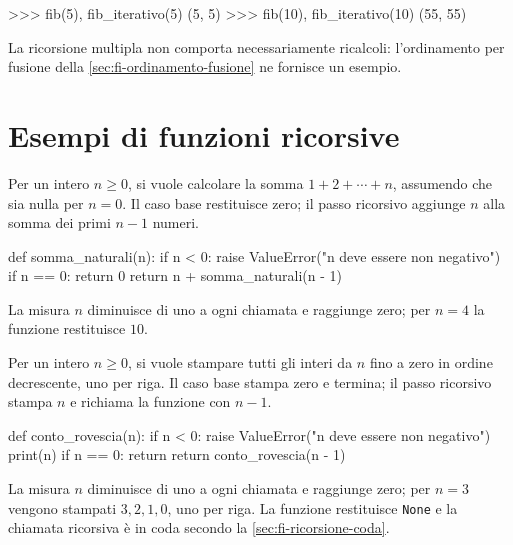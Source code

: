 \begin{unipdterminal}
>>> fib(5), fib_iterativo(5)
(5, 5)
>>> fib(10), fib_iterativo(10)
(55, 55)
\end{unipdterminal}

La ricorsione multipla non comporta necessariamente ricalcoli:
l'ordinamento per fusione della \cref{sec:fi-ordinamento-fusione}
ne fornisce un esempio.

\section{Esempi di funzioni ricorsive}
\label{sec:fi-esempi-ricorsione}

Per un intero \(n\ge0\), si vuole calcolare la somma
\(1+2+\cdots+n\), assumendo che sia nulla per \(n=0\).
Il caso base restituisce zero; il passo ricorsivo aggiunge
\(n\) alla somma dei primi \(n-1\) numeri.

\begin{unipdcode}[language=Python]
def somma_naturali(n):
    if n < 0:
        raise ValueError("n deve essere non negativo")
    if n == 0:
        return 0
    return n + somma_naturali(n - 1)
\end{unipdcode}

La misura \(n\) diminuisce di uno a ogni chiamata e raggiunge zero;
per \(n=4\) la funzione restituisce \(10\).

Per un intero \(n\ge0\), si vuole stampare tutti gli interi
da \(n\) fino a zero in ordine decrescente, uno per riga.
Il caso base stampa zero e termina; il passo ricorsivo stampa
\(n\) e richiama la funzione con \(n-1\).

\begin{unipdcode}[language=Python]
def conto_rovescia(n):
    if n < 0:
        raise ValueError("n deve essere non negativo")
    print(n)
    if n == 0:
        return
    return conto_rovescia(n - 1)
\end{unipdcode}

La misura \(n\) diminuisce di uno a ogni chiamata e raggiunge zero;
per \(n=3\) vengono stampati \(3,2,1,0\), uno per riga.
La funzione restituisce \texttt{None} e la chiamata ricorsiva
è in coda secondo la \cref{sec:fi-ricorsione-coda}.

